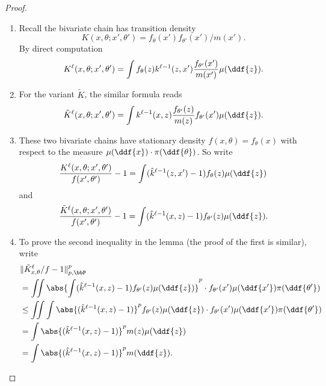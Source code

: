 \documentclass[12pt]{article}
\begin{document}
\begin{proof}
    \begin{enumerate}
        \item
            Recall the bivariate chain has transition density
            \[
                K(x, \theta; x', \theta') = f_{\theta}(x')f_{\theta'}(x')/m
                (x').
            \] By direct computation
            \[
                K^{\ell}(x,\theta; x', \theta') = \int f_{\theta}(z) k^{\ell-1}
                (z,x') \frac{f_{\theta'}(x')}{m(x')} \mu(\ddf{z}).
            \]
        \item
            For the variant \( \tilde{K} \), the similar formula reads
            \[
                \tilde{K}^{\ell}(x,\theta; x', \theta') = \int k^{\ell-1}
                (x,z) \frac{f_{\theta'}(z)}{m(z)} f_{\theta'}(x')\mu(\ddf
                {z}).
            \]
        \item
            These two bivariate chains have stationary density \( f(x,\theta)
            = f_{\theta}(x) \) with respect to the measure \( \mu(\ddf{x})
            \cdot \pi(\ddf{\theta}) \).  So write
            \[
                \frac{K^{\ell}(x,\theta; x', \theta')}{f(x', \theta')} -
                1 = \int (\hat{k}^{\ell-1}(z,x')-1) f_{\theta}(z) \mu(\ddf
                {z})
            \] and
            \[
                \frac{ \tilde{K}^{\ell}(x,\theta; x', \theta')}{f(x',
                \theta')} - 1 = \int (\hat{k}^{\ell-1}(x,z)-1) f_{\theta'}
                (z) \mu(\ddf{z}).
            \]
        \item
            To prove the second inequality in the lemma (the proof of
            the first is similar), write
            \begin{align*}
                & \| \tilde{K}_{x,\theta}^{\ell}/f - 1 \|_{p, \bbP}^p \\
                &= \iint \abs{\int (\hat{k}^{\ell-1}(x,z)-1) f_{\theta'}
                (z) \mu(\ddf{z})}^p \cdot f_{\theta'}(x') \mu(\ddf{x'})\pi
                (\ddf{\theta'}) \\
                &\le \iint \int \abs{ (\hat{k}^{\ell-1}(x,z)-1) }^p f_{\theta'}
                (z) \mu(\ddf{z}) \cdot f_{\theta'}(x') \mu(\ddf{x'})\pi(\ddf
                {\theta'}) \\
                &= \int \abs{ (\hat{k}^{\ell-1}(x,z)-1) }^p m(z) \mu(\ddf
                {z}) \\
                &= \int \abs{ (\hat{k}^{\ell-1}(x,z)-1) }^p m(\ddf{z}).
                \\
            \end{align*}
    \end{enumerate}
\end{proof}
\end{document}
